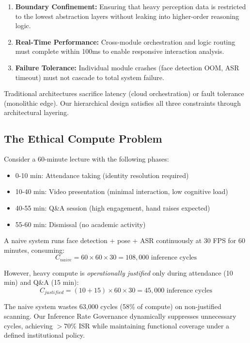 \documentclass[conference]{IEEEtran}
\begin{document}
\begin{enumerate}
    \item \textbf{Boundary Confinement:} Ensuring that heavy perception data is restricted to the lowest abstraction layers without leaking into higher-order reasoning logic.
    \item \textbf{Real-Time Performance:} Cross-module orchestration and logic routing must complete within 100ms to enable responsive interaction analysis.
    \item \textbf{Failure Tolerance:} Individual module crashes (face detection OOM, ASR timeout) must not cascade to total system failure.
\end{enumerate}

Traditional architectures sacrifice latency (cloud orchestration) or fault tolerance (monolithic edge). Our hierarchical design satisfies all three constraints through architectural layering.

\subsection{The Ethical Compute Problem}
Consider a 60-minute lecture with the following phases:
\begin{itemize}
    \item 0-10 min: Attendance taking (identity resolution required)
    \item 10-40 min: Video presentation (minimal interaction, low cognitive load)
    \item 40-55 min: Q\&A session (high engagement, hand raises expected)
    \item 55-60 min: Dismissal (no academic activity)
\end{itemize}

A naive system runs face detection + pose + ASR continuously at 30 FPS for 60 minutes, consuming:
$$C_{naive} = 60 \times 60 \times 30 = 108,000 \text{ inference cycles}$$

However, heavy compute is \textit{operationally justified} only during attendance (10 min) and Q\&A (15 min):
$$C_{justified} = (10 + 15) \times 60 \times 30 = 45,000 \text{ inference cycles}$$

The naive system wastes 63,000 cycles (58\% of compute) on non-justified scanning. Our Inference Rate Governance dynamically suppresses unnecessary cycles, achieving $>$70\% ISR while maintaining functional coverage under a defined institutional policy.

\end{document}
